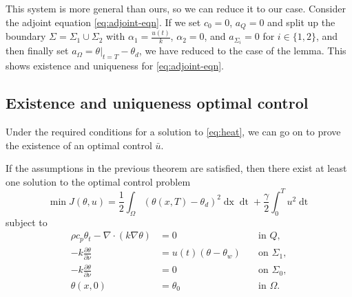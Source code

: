 This system is more general than ours, so we can reduce it to our case. Consider the adjoint equation \eqref{eq:adjoint-eqn}. If we set $c_0 = 0$, $a_Q = 0$ and split up the boundary $\Sigma = \Sigma_1 \cup \Sigma_2$ with $\alpha_1 = \frac{u(t)}{k}$, $\alpha_2 = 0$, and $a_{\Sigma_i}=0$ for $i\in \{1,2 \}$, and then finally set $a_{\Omega} = \theta|_{t=T}-\theta_d$, we have reduced to the case of the lemma. This shows existence and uniqueness for \eqref{eq:adjoint-eqn}.

\subsection{Existence and uniqueness optimal control}
Under the required conditions for a solution to \eqref{eq:heat}, we can go on to prove the existence of an optimal control $\bar{u}$.

\begin{theorem}
If the assumptions in the previous theorem are satisfied, then there exist at least one solution to the optimal control problem 
\begin{equation*}
       \min J(\theta, u) = \frac{1}{2} \int_\Omega (\theta(x, T) - \theta_d)^2 \mathop{dx} \mathop{dt} + \frac{\gamma}{2} \int_0^{T} u^2 \mathop{dt}
\end{equation*}
subject to
\begin{align*}
       \rho c_p \theta_t - \nabla \cdot (k \nabla \theta) &= 0 \quad &\text{in } Q,  \\
      -k \frac{\partial \theta}{\partial \nu} &= u(t) (\theta - \theta_w) \quad &\text{on } \Sigma_1, \\
      -k \frac{\partial \theta}{\partial \nu} &= 0 \quad &\text{on } \Sigma_0, \\
      \theta(x, 0) &= \theta_0 & \text{in $\Omega$.}
\end{align*}
\end{theorem}

